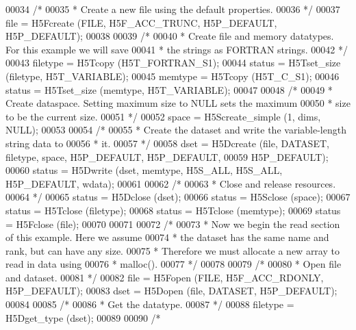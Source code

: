 \begin{DoxyCode}
00034     \textcolor{comment}{/*}
00035 \textcolor{comment}{     * Create a new file using the default properties.}
00036 \textcolor{comment}{     */}
00037     file = H5Fcreate (FILE, H5F\_ACC\_TRUNC, H5P\_DEFAULT, H5P\_DEFAULT);
00038 
00039     \textcolor{comment}{/*}
00040 \textcolor{comment}{     * Create file and memory datatypes.  For this example we will save}
00041 \textcolor{comment}{     * the strings as FORTRAN strings.}
00042 \textcolor{comment}{     */}
00043     filetype = H5Tcopy (H5T\_FORTRAN\_S1);
00044     status = H5Tset\_size (filetype, H5T\_VARIABLE);
00045     memtype = H5Tcopy (H5T\_C\_S1);
00046     status = H5Tset\_size (memtype, H5T\_VARIABLE);
00047 
00048     \textcolor{comment}{/*}
00049 \textcolor{comment}{     * Create dataspace.  Setting maximum size to NULL sets the maximum}
00050 \textcolor{comment}{     * size to be the current size.}
00051 \textcolor{comment}{     */}
00052     space = H5Screate\_simple (1, dims, NULL);
00053 
00054     \textcolor{comment}{/*}
00055 \textcolor{comment}{     * Create the dataset and write the variable-length string data to}
00056 \textcolor{comment}{     * it.}
00057 \textcolor{comment}{     */}
00058     dset = H5Dcreate (file, DATASET, filetype, space, H5P\_DEFAULT, H5P\_DEFAULT,
00059                 H5P\_DEFAULT);
00060     status = H5Dwrite (dset, memtype, H5S\_ALL, H5S\_ALL, H5P\_DEFAULT, wdata);
00061 
00062     \textcolor{comment}{/*}
00063 \textcolor{comment}{     * Close and release resources.}
00064 \textcolor{comment}{     */}
00065     status = H5Dclose (dset);
00066     status = H5Sclose (space);
00067     status = H5Tclose (filetype);
00068     status = H5Tclose (memtype);
00069     status = H5Fclose (file);
00070 
00071 
00072     \textcolor{comment}{/*}
00073 \textcolor{comment}{     * Now we begin the read section of this example.  Here we assume}
00074 \textcolor{comment}{     * the dataset has the same name and rank, but can have any size.}
00075 \textcolor{comment}{     * Therefore we must allocate a new array to read in data using}
00076 \textcolor{comment}{     * malloc().}
00077 \textcolor{comment}{     */}
00078 
00079     \textcolor{comment}{/*}
00080 \textcolor{comment}{     * Open file and dataset.}
00081 \textcolor{comment}{     */}
00082     file = H5Fopen (FILE, H5F\_ACC\_RDONLY, H5P\_DEFAULT);
00083     dset = H5Dopen (file, DATASET, H5P\_DEFAULT);
00084 
00085     \textcolor{comment}{/*}
00086 \textcolor{comment}{     * Get the datatype.}
00087 \textcolor{comment}{     */}
00088     filetype = H5Dget\_type (dset);
00089 
00090     \textcolor{comment}{/*}

\end{DoxyCode}
